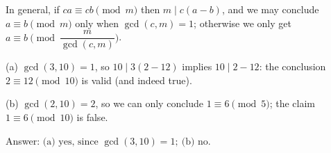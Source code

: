 In general, if $ca\equiv cb\pmod m$ then $m\mid c(a-b)$, and we may conclude $a\equiv b\pmod m$ only when $\gcd(c,m)=1$; otherwise we only get $a\equiv b\pmod{\dfrac{m}{\gcd(c,m)}}$.

(a) $\gcd(3,10)=1$, so $10\mid3(2-12)$ implies $10\mid2-12$: the conclusion $2\equiv12\pmod{10}$ is valid (and indeed true).

(b) $\gcd(2,10)=2$, so we can only conclude $1\equiv6\pmod5$; the claim $1\equiv6\pmod{10}$ is false.

Answer: $\boxed{\text{(a) yes, since }\gcd(3,10)=1;\ \text{(b) no}}$.
